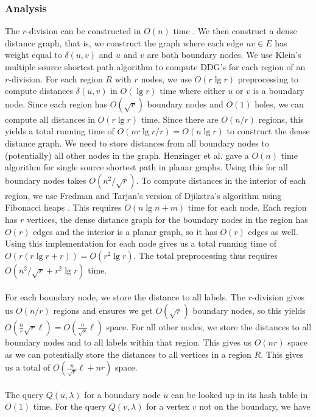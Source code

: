 \subsubsection{Analysis}
The $r$-division can be constructed in $O(n)$ time \cite{klein2013structured}. We then
construct a dense distance graph, that is, we construct the graph where each edge $uv\in
E$ has weight equal to $\delta(u,v)$ and $u$ and $v$ are both boundary nodes. We use
Klein's multiple source shortest path algorithm \cite{klein2005multiple} to compute DDG's
for each region of an $r$-division. For each region $R$ with $r$ nodes, we use $O(r\lg
r)$ preprocessing to compute distances $\delta(u,v)$ in $O(\lg r)$ time where either $u$
or $v$ is a boundary node. Since each region has $O(\sqrt{r})$ boundary nodes and $O(1)$
holes, we can compute all distances in $O(r\lg r)$ time. Since there are $O(n/r)$
regions, this yields a total running time of $O(nr\lg r/r)=O(n\lg r)$ to construct the
dense distance graph. We need to store distances from all boundary nodes to (potentially)
all other nodes in the graph. Henzinger et al. \cite{henzinger1997faster} gave a $O(n)$
time algorithm for single source shortest path in planar graphs. Using this for all
boundary nodes takes $O(n^2/\sqrt{r})$. To compute distances in the interior of each
region, we use Fredman and Tarjan's version of Djikstra's algorithm using Fibonacci heaps
\cite{fredman1987fibonacci}. This requires $O(n\lg n + m)$ time for each node. Each
region has $r$ vertices, the dense distance graph for the boundary nodes in the region has
$O(r)$ edges and the interior is a planar graph, so it has $O(r)$ edges as well. Using
this implementation for each node gives us a total running time of $O(r(r\lg r + r))=O(r^2\lg
r)$. The total preprocessing thus requires $O(n^2/\sqrt{r}+r^2\lg r)$ time. \\
\\
For each boundary node, we store the distance to all labels. The $r$-division gives us
$O(n/r)$ regions and ensures we
get $O(\sqrt{r})$ boundary nodes, so this yields
$O(\frac{n}{r}\sqrt{r}\ell)=O(\frac{n}{\sqrt{r}}\ell)$ space. For all other nodes, we
store the distances to all boundary nodes and to all labels within that region. This
gives us $O(nr)$ space as we can potentially store the distances to all vertices in a
region $R$. This gives us a total of $O(\frac{n}{\sqrt{r}}\ell+nr)$ space. \\
\\
The query $Q(u,\lambda)$ for a boundary node $u$ can be looked up in its hash table in
$O(1)$ time. For the query $Q(v,\lambda)$ for a vertex $v$ not on the boundary, we have
